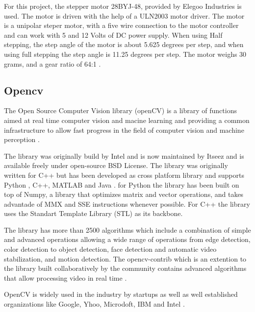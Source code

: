 \documentclass[sigconf]{acmart}
\begin{document}
For this project, the stepper motor 28BYJ-48, provided by Elegoo Industries is used. The motor is driven with the help of a ULN2003 motor driver. The motor is a unipolar steper motor, with a five wire connection to the motor controller and can work with 5 and 12 Volts of DC power supply. When using Half stepping, the step angle of the motor is about 5.625 degrees per step, and when using full stepping the step angle is 11.25 degrees per step.
The motor weighs 30 grams, and a gear ratio of 64:1 \cite{elegoo}\cite{elegoo-desc}.

\subsection{Opencv}

The Open Source Computer Vision library (openCV) is a library of functions aimed at real time computer vision and macine learning and providing a common infrastructure to allow fast progress in the field of computer vision and machine perception \cite{opencv-wiki}\cite{official-opencv}.

The library was originally build by Intel and is now maintained by Itseez and is available freely under open-source BSD License. The library was originally written for C++ but has been developed as cross platform library and supports Python , C++, MATLAB and Java \cite{official-opencv}. for Python the library has been built on top of Numpy, a library that optimizes matrix and vector operations, and takes advantade of MMX and SSE instructions whenever possible. For C++ the library uses the Standart Template Library (STL) as its backbone.

The library has more than 2500 algorithms which include a combination of simple and advanced operations allowing a wide range of operations from edge detection, color detection to object detection, face detection and automatic video stabilization, and motion detection. The opencv-contrib which is an extention to the library built collaboratively by the community contains advanced algorithms that allow processing video in real time \cite{official-opencv}.

OpenCV is widely used in the industry by startups as well as well established organizations like Google, Yhoo, Microdoft, IBM and Intel \cite{official-opencv}.
\end{document}
